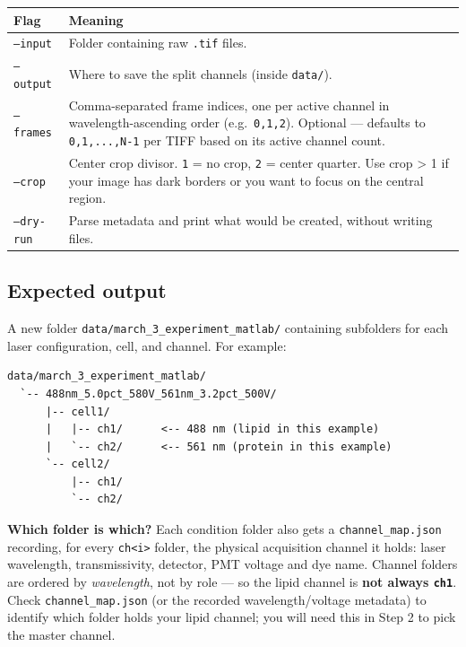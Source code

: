 \documentclass[11pt]{article}
\newcommand{\code}[1]{\texttt{#1}}
\newcommand{\flag}[1]{\texttt{#1}}
\begin{document}
\begin{tabularx}{\linewidth}{l X}
\toprule
\textbf{Flag} & \textbf{Meaning} \\
\midrule
\flag{--input}    & Folder containing raw \code{.tif} files. \\
\flag{--output}   & Where to save the split channels (inside \code{data/}). \\
\flag{--frames}   & Comma-separated frame indices, one per active channel
                    in wavelength-ascending order (e.g.\ \code{0,1,2}).
                    Optional --- defaults to \code{0,1,...,N-1} per
                    TIFF based on its active channel count. \\
\flag{--crop}     & Center crop divisor. \code{1} = no crop, \code{2} =
                    center quarter. Use crop > 1 if your image has
                    dark borders or you want to focus on the central
                    region. \\
\flag{--dry-run}  & Parse metadata and print what would be created,
                    without writing files. \\
\bottomrule
\end{tabularx}

\subsection*{Expected output}

A new folder \code{data/march\_3\_experiment\_matlab/} containing
subfolders for each laser configuration, cell, and channel. For
example:

\begin{lstlisting}
data/march_3_experiment_matlab/
  `-- 488nm_5.0pct_580V_561nm_3.2pct_500V/
      |-- cell1/
      |   |-- ch1/      <-- 488 nm (lipid in this example)
      |   `-- ch2/      <-- 561 nm (protein in this example)
      `-- cell2/
          |-- ch1/
          `-- ch2/
\end{lstlisting}

\begin{notebox}
\textbf{Which folder is which?} Each condition folder also gets a
\code{channel\_map.json} recording, for every \code{ch<i>} folder,
the physical acquisition channel it holds: laser wavelength,
transmissivity, detector, PMT voltage and dye name. Channel folders
are ordered by \emph{wavelength}, not by role --- so the lipid
channel is \textbf{not always \code{ch1}}. Check
\code{channel\_map.json} (or the recorded wavelength/voltage
metadata) to identify which folder holds your lipid channel; you
will need this in Step 2 to pick the master channel.
\end{notebox}
\end{document}
